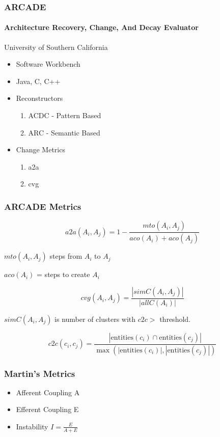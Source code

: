 \documentclass{beamer}
\begin{document}
\begin{frame}
	\frametitle{ARCADE}
	\framesubtitle{Architecture Recovery, Change, And Decay Evaluator }
	
	University of Southern California
	
	\begin{itemize}
		\item Software Workbench
		\item Java, C, C++
		\item Reconstructors
		\begin{enumerate}
			\item ACDC - Pattern Based
			\item ARC - Semantic Based
		\end{enumerate}
		\item Change Metrics
		\begin{enumerate}
			\item a2a
			\item cvg
		\end{enumerate}
	\end{itemize}
		
\end{frame}

\begin{frame}
	\frametitle{ARCADE Metrics}
	
		\[
		a2a(A_i, A_j) = 1 - \frac{mto(A_i, A_j)}{aco(A_i) + aco(A_j)}
		\]
		
		$mto(A_i, A_j)$ steps from $A_i$ to $A_j$
		
		$aco(A_i)$ = steps to create $A_i$
		
		\pause
		
		\[
		cvg(A_i, A_j) = \frac{|simC(A_i, A_j)|}{|allC(A_i)|}
		\]
		
		$simC(A_i, A_j)$ is number of clusters with $c2c >$ threshold. 
		
		\[
		c2c(c_i, c_j) = \frac{|\text{entities}(c_i) \cap \text{entities}(c_j)|}{\max(|\text{entities}(c_i)|, |\text{entities}(c_j)|)}
		\]
\end{frame}

\begin{frame}
	\frametitle{Martin's Metrics}
	
	\begin{itemize}
		\item Afferent Coupling A
		\item Efferent Coupling E
		\item Instability $I = \frac{E}{A + E} $
	\end{itemize}
	
\end{frame}
\end{document}
